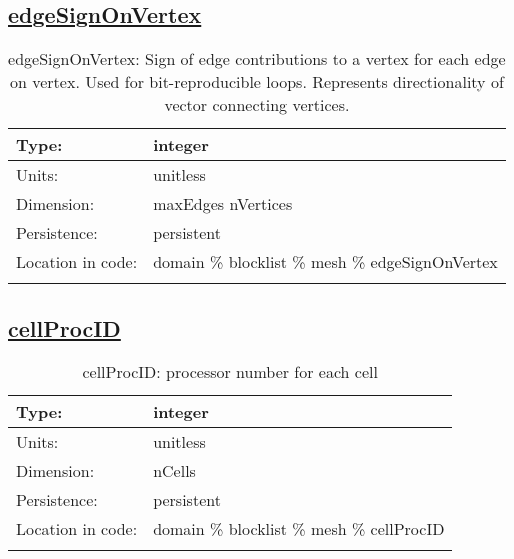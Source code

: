 \subsection[edgeSignOnVertex]{\hyperref[sec:var_tab_mesh]{edgeSignOnVertex}}
\label{subsec:var_sec_mesh_edgeSignOnVertex}
\begin{center}
\begin{longtable}{| p{2.0in} | p{4.0in} |}
        \hline 
        Type: & integer \\
        \hline 
        Units: & \si{unitless} \\
        \hline 
        Dimension: & maxEdges nVertices \\
        \hline 
        Persistence: & persistent \\
        \hline 
         Location in code: & domain \% blocklist \% mesh \% edgeSignOnVertex \\
         \hline 
    \caption{edgeSignOnVertex: Sign of edge contributions to a vertex for each edge on vertex. Used for bit-reproducible loops. Represents directionality of vector connecting vertices.}
\end{longtable}
\end{center}
\subsection[cellProcID]{\hyperref[sec:var_tab_mesh]{cellProcID}}
\label{subsec:var_sec_mesh_cellProcID}
\begin{center}
\begin{longtable}{| p{2.0in} | p{4.0in} |}
        \hline 
        Type: & integer \\
        \hline 
        Units: & \si{unitless} \\
        \hline 
        Dimension: & nCells \\
        \hline 
        Persistence: & persistent \\
        \hline 
         Location in code: & domain \% blocklist \% mesh \% cellProcID \\
         \hline 
    \caption{cellProcID: processor number for each cell}
\end{longtable}
\end{center}
